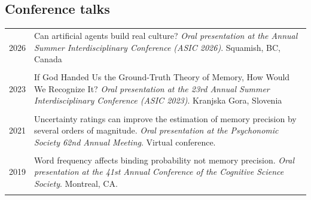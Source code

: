 \documentclass[letterpaper]{article}
\begin{document}
\subsection*{Conference talks}
\begin{longtable}{p{0.7cm}p{15cm}}
  2026 & Can artificial agents build real culture? {\it Oral presentation at the Annual Summer Interdisciplinary Conference (ASIC 2026)}. Squamish, BC, Canada                                                                                                  \\[6pt]
  &                                                                                                                                                                                                                                                        \\
  2023 & If God Handed Us the Ground-Truth Theory of Memory, How Would We Recognize It? {\it Oral presentation at the 23rd Annual Summer Interdisciplinary Conference (ASIC 2023)}. Kranjska Gora, Slovenia                                                     \\ [6pt]
  &                                                                                                                                                                                                                                                        \\
  2021 & Uncertainty ratings can improve the estimation of memory precision by several orders of magnitude. {\it Oral presentation at the Psychonomic Society 62nd Annual Meeting}. Virtual conference.                                                         \\ [6pt]
  &                                                                                                                                                                                                                                                        \\
  2019 & Word frequency affects binding probability not memory precision. {\it Oral presentation at the 41st Annual Conference of the Cognitive Science Society}. Montreal, CA.                                                                                 \\[6pt]
  &                                                                                                                                                                                                                                                        \\

\end{longtable}
\end{document}
